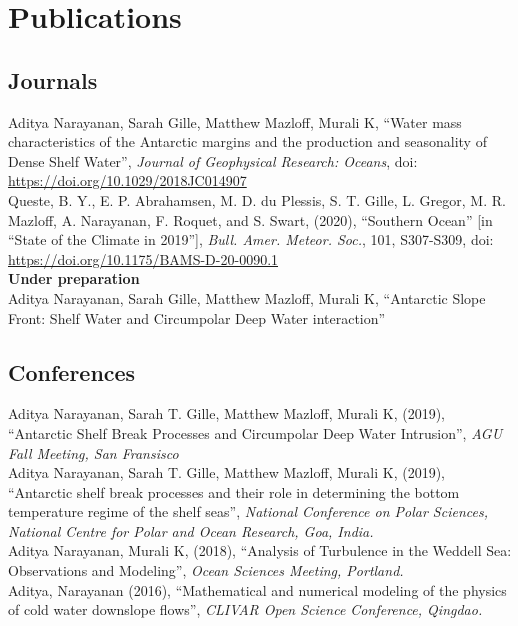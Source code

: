 \documentclass[10pt, a4paper]{article}
\newcommand{\years}[1]{\marginnote{\small #1}}
\begin{document}
\section*{Publications}

\subsection*{\bf Journals}
\years{2019}Aditya Narayanan, Sarah Gille, Matthew Mazloff, Murali K, ``Water mass characteristics of the Antarctic margins and the production and seasonality of Dense Shelf Water'', \emph{Journal of Geophysical Research: Oceans}, doi: \url{https://doi.org/10.1029/2018JC014907}\\
\years{2020} Queste, B. Y., E. P. Abrahamsen, M. D. du Plessis, S. T. Gille, L. Gregor, M. R. Mazloff, A. Narayanan, F. Roquet, and S. Swart, (2020), ``Southern Ocean'' [in ``State of the Climate in 2019''], \emph{Bull. Amer. Meteor. Soc.}, 101, S307-S309, doi: \url{https://doi.org/10.1175/BAMS-D-20-0090.1}\\

{\bf Under preparation}\\

\years{}Aditya Narayanan, Sarah Gille, Matthew Mazloff, Murali K, ``Antarctic Slope Front: Shelf Water and Circumpolar Deep Water interaction''\\


\subsection*{\bf Conferences}
\years{2019}Aditya Narayanan, Sarah T. Gille, Matthew Mazloff, Murali K, (2019), ``Antarctic Shelf Break Processes and Circumpolar Deep Water Intrusion'', \emph{AGU Fall Meeting, San Fransisco}\\

\years{2019}Aditya Narayanan, Sarah T. Gille, Matthew Mazloff, Murali K, (2019), ``Antarctic shelf break processes and their role in determining the bottom temperature regime of the shelf seas'', \emph{National Conference on Polar Sciences, National Centre for Polar and Ocean Research, Goa, India.}\\

\years{2018}Aditya Narayanan, Murali K, (2018), ``Analysis of Turbulence in the Weddell Sea: Observations and Modeling'', \emph{Ocean Sciences Meeting, Portland.}\\

\years{2016}Aditya, Narayanan (2016), ``Mathematical and numerical modeling of the physics of cold water downslope flows'', \emph{CLIVAR Open Science Conference, Qingdao.}
\end{document}
